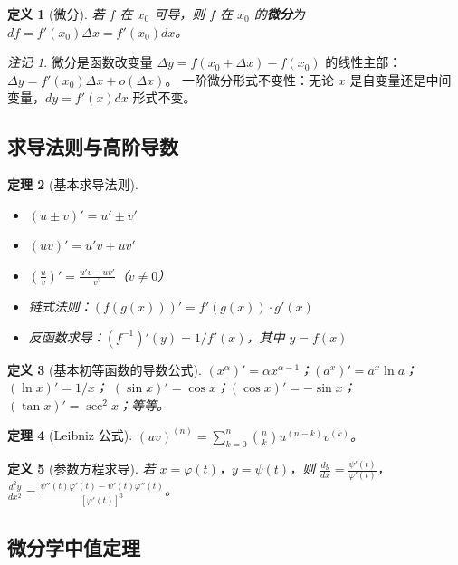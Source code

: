 \documentclass[12pt,a4paper]{ctexart}
\newtheorem{theorem}{定理}[section]
\newtheorem{definition}[theorem]{定义}
\theoremstyle{remark}
\newtheorem{remark}{注记}[section]
\begin{document}
\begin{definition}[微分]
若 $f$ 在 $x_0$ 可导，则 $f$ 在 $x_0$ 的\textbf{微分}为
$df = f'(x_0) \Delta x = f'(x_0) dx$。
\end{definition}

\begin{remark}
微分是函数改变量 $\Delta y = f(x_0+\Delta x)-f(x_0)$ 的线性主部：
$\Delta y = f'(x_0) \Delta x + o(\Delta x)$。
一阶微分形式不变性：无论 $x$ 是自变量还是中间变量，$dy = f'(x)dx$ 形式不变。
\end{remark}

\subsection{求导法则与高阶导数}

\begin{theorem}[基本求导法则]
\begin{itemize}
  \item $(u \pm v)' = u' \pm v'$
  \item $(uv)' = u'v + uv'$
  \item $(\frac{u}{v})' = \frac{u'v - uv'}{v^2}$（$v \neq 0$）
  \item 链式法则：$(f(g(x)))' = f'(g(x)) \cdot g'(x)$
  \item 反函数求导：$(f^{-1})'(y) = 1/f'(x)$，其中 $y = f(x)$
\end{itemize}
\end{theorem}

\begin{definition}[基本初等函数的导数公式]
$(x^\alpha)' = \alpha x^{\alpha-1}$；$(a^x)' = a^x\ln a$；$(\ln x)' = 1/x$；
$(\sin x)' = \cos x$；$(\cos x)' = -\sin x$；$(\tan x)' = \sec^2 x$；等等。
\end{definition}

\begin{theorem}[Leibniz 公式]
$(uv)^{(n)} = \sum_{k=0}^n \binom{n}{k} u^{(n-k)} v^{(k)}$。
\end{theorem}

\begin{definition}[参数方程求导]
若 $x = \varphi(t)$，$y = \psi(t)$，则 $\frac{dy}{dx} = \frac{\psi'(t)}{\varphi'(t)}$，
$\frac{d^2y}{dx^2} = \frac{\psi''(t)\varphi'(t)-\psi'(t)\varphi''(t)}{[\varphi'(t)]^3}$。
\end{definition}

\subsection{微分学中值定理}
\end{document}
